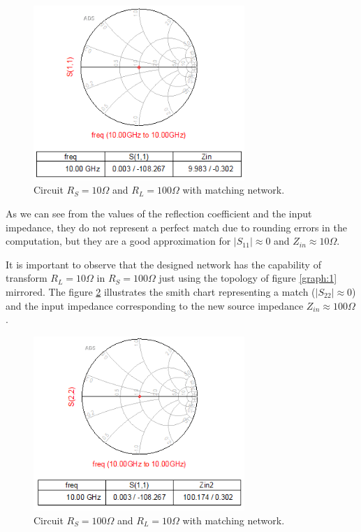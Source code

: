 \begin{figure}[H] 
\centering
\includegraphics[width=8cm]{images/smith2.PNG}
\caption{Circuit $R_S=10 \Omega$ and $R_L=100 \Omega$ with matching network.}
\label{fig:smith2} 
\end{figure}

As we can see from the values of the reflection coefficient and the input impedance, they do not represent a perfect match due to rounding errors in the computation, but they are a good approximation for $|S_{11}| \approx 0$ and $Z_{in} \approx 10 \Omega$.

It is important to observe that the designed network has the capability of transform $R_L = 10 \Omega$ in $R_S = 100 \Omega$ just using the topology of figure \ref{graph:1} mirrored. The figure \ref{fig:smith3} illustrates the smith chart representing a match ($|S_{22}| \approx 0$) and the input impedance corresponding to the new source impedance $Z_{in} \approx 100 \Omega$.

\begin{figure}[H] 
\centering
\includegraphics[width=8cm]{images/smith3.PNG}
\caption{Circuit $R_S=100 \Omega$ and $R_L=10 \Omega$ with matching network.}
\label{fig:smith3} 
\end{figure}


